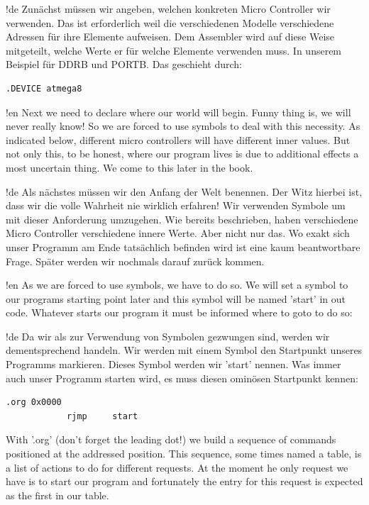 !de Zunächst müssen wir angeben, welchen konkreten Micro Controller wir verwenden. Das ist erforderlich weil die verschiedenen Modelle verschiedene Adressen für ihre Elemente aufweisen. Dem Assembler wird auf diese Weise mitgeteilt, welche Werte er für welche Elemente verwenden muss. In unserem Beispiel für DDRB und PORTB. Das geschieht durch:

\begin{lstlisting}
.DEVICE atmega8
\end{lstlisting}



!en Next we need to declare where our world will begin. Funny thing is, we will never really know! So we are forced to use symbols to deal with this necessity. As indicated below, different micro controllers will have different inner values. But not only this, to be honest, where our program lives is due to additional effects a most uncertain thing. We come to this later in the book.

!de Als nächstes müssen wir den Anfang der Welt benennen. Der Witz hierbei ist, dass wir die volle Wahrheit nie wirklich erfahren! Wir verwenden Symbole um mit dieser Anforderung umzugehen. Wie bereits beschrieben, haben verschiedene Micro Controller verschiedene innere Werte. Aber nicht nur das. Wo exakt sich unser Programm am Ende tatsächlich befinden wird ist eine kaum beantwortbare Frage. Später werden wir nochmals darauf zurück kommen.


!en As we are forced to use symbols, we have to do so. We will set a symbol to our programs starting point later and this symbol will be named 'start' in out code. Whatever starts our program it must be informed where to goto to do so:

!de Da wir als zur Verwendung von Symbolen gezwungen sind, werden wir dementsprechend handeln. Wir werden mit einem Symbol den Startpunkt unseres Programms markieren. Dieses Symbol werden wir 'start' nennen. Was immer auch unser Programm starten wird, es muss diesen ominösen Startpunkt kennen:

\begin{lstlisting}
.org 0x0000
            rjmp     start 
\end{lstlisting}



With '.org' (don't forget the leading dot!) we build a sequence of commands positioned at the addressed position. This sequence, some times named a table, is a list of actions to do for different requests. At the moment he only request we have is to start our program and fortunately the entry for this request is expected as the first in our table.

